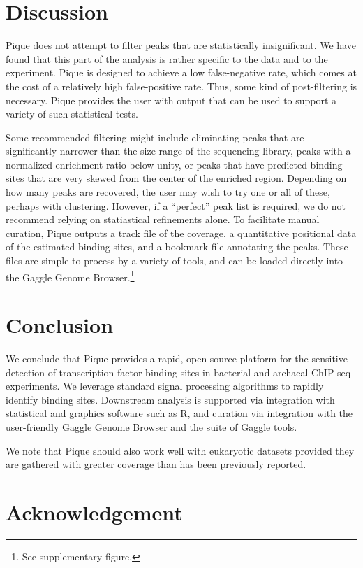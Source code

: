 \documentclass{bioinfo}
\begin{document}
\section{Discussion}

Pique does not attempt to filter peaks that are statistically
insignificant. We have found that this part of the analysis is rather
specific to the data and to the experiment. Pique is designed to
achieve a low false-negative rate, which comes at the cost of a
relatively high false-positive rate. Thus, some kind of post-filtering
is necessary. Pique provides the user with output that can be used to
support a variety of such statistical tests.

Some recommended filtering might include eliminating peaks that are
significantly narrower than the size range of the sequencing library,
peaks with a normalized enrichment ratio below unity, or peaks that
have predicted binding sites that are very skewed from the center of
the enriched region. Depending on how many peaks are recovered, the
user may wish to try one or all of these, perhaps with
clustering. However, if a ``perfect'' peak list is required, we do not
recommend relying on statiastical refinements alone. To facilitate
manual curation, Pique outputs a track file of the coverage, a
quantitative positional data of the estimated binding sites, and a
bookmark file annotating the peaks. These files are simple to process
by a variety of tools, and can be loaded directly into the Gaggle
Genome Browser.\footnote{See supplementary figure.}

\section{Conclusion}

We conclude that Pique provides a rapid, open source platform for the
sensitive detection of transcription factor binding sites in bacterial
and archaeal ChIP-seq experiments. We leverage standard signal
processing algorithms to rapidly identify binding sites. Downstream
analysis is supported via integration with statistical and graphics
software such as R, and curation via integration with the
user-friendly Gaggle Genome Browser and the suite of Gaggle tools.

We note that Pique should also work well with eukaryotic datasets
provided they are gathered with greater coverage than has been
previously reported.

\section*{Acknowledgement}
\end{document}
